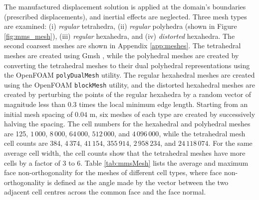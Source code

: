 \documentclass[sn-mathphys,Numbered]{sn-jnl}%
\begin{document}
The manufactured displacement solution is applied at the domain's boundaries (prescribed displacements), and inertial effects are neglected.
Three mesh types are examined:
(i) \emph{regular} tetrahedra, (ii) \emph{regular} polyhedra (shown in Figure \ref{fig:mms_mesh}), (iii) \emph{regular} hexahedra, and (iv) \emph{distorted} hexahedra.
The second coarsest meshes are shown in Appendix \ref{app:meshes}.
The tetrahedral meshes are created using Gmsh \citep{geuzaine2009gmsh}, while the polyhedral meshes are created by converting the tetrahedral meshes to their dual polyhedral representations using the OpenFOAM \texttt{polyDualMesh} utility.
The regular hexahedral meshes are created using the OpenFOAM \texttt{blockMesh} utility, and the distorted hexahedral meshes are created by perturbing the points of the regular hexahedra by a random vector of magnitude less than 0.3 times the local minimum edge length.
Starting from an initial mesh spacing of $0.04$ m, six meshes of each type are created by successively halving the spacing.
The cell numbers for the hexahedral and polyhedral meshes are 125, $1\,000$, $8\,000$, $64\,000$, $512\,000$, and $4\,096\,000$, while the tetrahedral mesh cell counts are 384, $4\,374$, $41\,154$, $355\,914$, $2\,958\,234$, and $24\,118\,074$.
For the same average cell width, the cell counts show that the tetrahedral meshes have more cells by a factor of 3 to 6.
Table \ref{tab:mmsMesh} lists the average and maximum face non-orthogonality for the meshes of different cell types, where face non-orthogonality is defined as the angle made by the vector between the two adjacent cell centres across the common face and the face normal.
\end{document}
